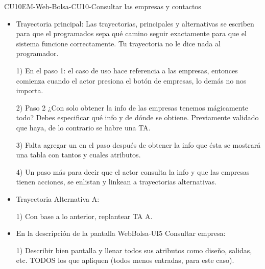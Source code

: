 \begin{UseCase}{CU10}{EM-Web-Bolsa-CU10-Consultar las empresas y contactos}
{\begin{itemize}
						1) Escribir algo en los campos ''entradas'' y ''origen'' así sea las palabras ''ninguna'' o ''no aplica''.

						2) ¿No hay salidas en una CONSULTA? Corregir este campo y su correspondiente ''destino''.

						3) No es primario, viene de consultar ofertas.
				\item Trayectoria principal: Las trayectorias, principales y alternativas se escriben para que el programados sepa qué camino seguir exactamente para que el sistema funcione correctamente. Tu trayectoria no le dice nada al programador. 

						1) En el paso 1: el caso de uso hace referencia a las empresas, entonces comienza cuando el actor presiona el botón de empresas, lo demás no nos importa.

						2) Paso 2 ¿Con solo obtener la info de las empresas tenemos mágicamente todo? Debes especificar qué info y de dónde se obtiene. Previamente validado que haya, de lo contrario se habre una TA.

						3) Falta agregar un en el paso después de obtener la info que ésta se mostrará una tabla con tantos y cuales atributos. 

						4) Un paso más para decir que el actor consulta la info y que las empresas tienen acciones, se enlistan y linkean a trayectorias alternativas. 
				\item Trayectoria Alternativa A:

						1) Con base a lo anterior, replantear TA A.
				\item En la descripción de la pantalla WebBolsa-UI5 Consultar empresa:

						1) Describir bien pantalla y llenar todos sus atributos como diseño, salidas, etc. TODOS los que apliquen (todos menos entradas, para este caso).
			\end{itemize}
 		}
	\end{UseCase}
	\newpage
	
